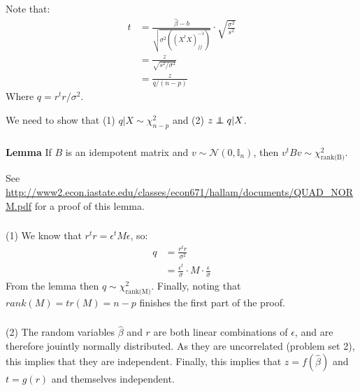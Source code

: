 \begin{frame}[fragile] \frametitle{}

Note that:
\begin{align*}
t &= \frac{\widehat{\beta} - b}{\sqrt{\sigma^2  \left( (X^t X)^{-1}_{jj} \right)}} \cdot \sqrt{\frac{\sigma^2}{s^2}} \\
&= \frac{z}{\sqrt{s^2 / \sigma^2}} \\
&= \frac{z}{q / (n-p)}
\end{align*}
\pause Where $q = r^t r / \sigma^2$.

\pause We need to show that (1) $q | X \sim \chi^2_{n-p}$ and
(2) $z \independent q | X$.

\end{frame}

\begin{frame}[fragile] \frametitle{}

{\bf Lemma} If $B$ is an idempotent matrix and
$v \sim \mathcal{N} (0, \mathbb{I}_n)$, then
$v^t B v \sim \chi^2_{\text{rank(B)}}$.

\pause
See \url{http://www2.econ.iastate.edu/classes/econ671/hallam/documents/QUAD_NORM.pdf}
for a proof of this lemma.

\end{frame}

\begin{frame}[fragile] \frametitle{}

(1) We know that $r^t r = \epsilon^t M \epsilon$, so:
\begin{align*}
q &= \frac{r^t r}{\sigma^2} \\
&= \frac{\epsilon^t}{\sigma} \cdot M \cdot \frac{\epsilon}{\sigma}
\end{align*}
\pause From the lemma then $q \sim \chi^2_{\text{rank(M)}}$. Finally,
noting that $rank(M) = tr(M) = n - p$ finishes the first part of the
proof.

\end{frame}

\begin{frame}[fragile] \frametitle{}

(2) The random variables $\widehat{\beta}$ and $r$ are both
linear combinations of $\epsilon$, and are therefore jouintly
normally distributed. As they are uncorrelated (problem set 2),
this implies that they are independent. Finally, this implies that
$z = f(\widehat{\beta})$ and $t = g(r)$ and themselves independent.

\end{frame}

